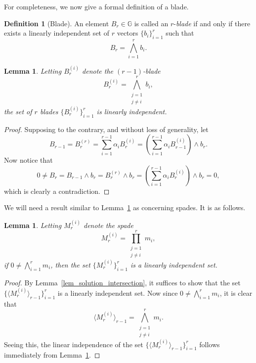 \documentclass{birkjour}
\newtheorem{lem}[thm]{Lemma}
\theoremstyle{definition}
\newtheorem{defn}[thm]{Definition}
\theoremstyle{remark}
\numberwithin{equation}{section}
\newcommand{\G}{\mathbb{G}}
\begin{document}
For completeness, we now give a formal definition of a blade.
\begin{defn}[Blade]
An element $B_r\in\G$ is called an $r$-\emph{blade} if and only if there exists a linearly independent set of $r$
vectors $\{b_i\}_{i=1}^r$ such that
\begin{equation}\label{equ_B_r}
B_r = \bigwedge_{i=1}^r b_i.
\end{equation}
\end{defn}

\begin{lem}\label{lem_lin_indep_subblades}
Letting $B_r^{(i)}$ denote the $(r-1)$-blade
\begin{equation*}
B_r^{(i)} = \bigwedge_{\substack{j=1\\j\neq i}}^r b_i,
\end{equation*}
the set of $r$ blades $\{B_r^{(i)}\}_{i=1}^r$ is linearly independent.
\end{lem}
\begin{proof}
Supposing to the contrary, and without loss of generality, let
\begin{equation*}
B_{r-1} = B_r^{(r)} = \sum_{i=1}^{r-1}\alpha_i B_r^{(i)} = \left(\sum_{i=1}^{r-1}\alpha_i B_{r-1}^{(i)}\right)\wedge b_r.
\end{equation*}
Now notice that
\begin{equation*}
0\neq B_r = B_{r-1}\wedge b_r = B_r^{(r)}\wedge b_r = \left(\sum_{i=1}^{r-1}\alpha_i B_r^{(i)}\right)\wedge b_r = 0,
\end{equation*}
which is clearly a contradiction.
\end{proof}

We will need a result similar to Lemma~\ref{lem_lin_indep_subblades} as concerning spades.  It is as follows.
\begin{lem}\label{lem_lin_indep_subspades}
Letting $M_r^{(i)}$ denote the spade
\begin{equation*}
M_r^{(i)} = \prod_{\substack{j=1\\j\neq i}}^r m_i,
\end{equation*}
if $0\neq\bigwedge_{i=1}^r m_i$, then the set $\{M_r^{(i)}\}_{i=1}^r$ is a linearly independent set.
\end{lem}
\begin{proof}
By Lemma~\ref{lem_solution_intersection}, it suffices to show that the set $\{\langle M_r^{(i)}\rangle_{r-1}\}_{i=1}^r$ is a linearly independent set.
Now since $0\neq\bigwedge_{i=1}^r m_i$, it is clear that
\begin{equation*}
\langle M_r^{(i)}\rangle_{r-1} = \bigwedge_{\substack{j=1\\j\neq i}}^r m_i.
\end{equation*}
Seeing this, the linear independence of the set $\{\langle M_r^{(i)}\rangle_{r-1}\}_{i=1}^r$ follows immediately
from Lemma~\ref{lem_lin_indep_subblades}.
\end{proof}
\end{document}
